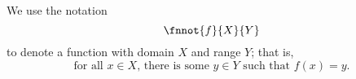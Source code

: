 \begin{note}
  We use the notation
  $$\fnnot{f}{X}{Y}$$
  to denote a function with domain $X$ and range $Y$;
  that is, 
  $$\text{for all $x \in X$, there is some $y \in Y$ such that $f(x) = y$}.$$%
\end{note}
